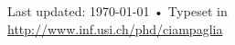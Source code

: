 \documentclass[10pt, a4paper]{article}
\begin{document}
\vfill{}

\begin{center}
{\scriptsize  Last updated: \today\- •\- 
Typeset in { \XeTeX}\\
\href{http://www.inf.usi.ch/phd/ciampaglia}{http://www.inf.usi.ch/phd/ciampaglia}}
\end{center}
\end{document}
